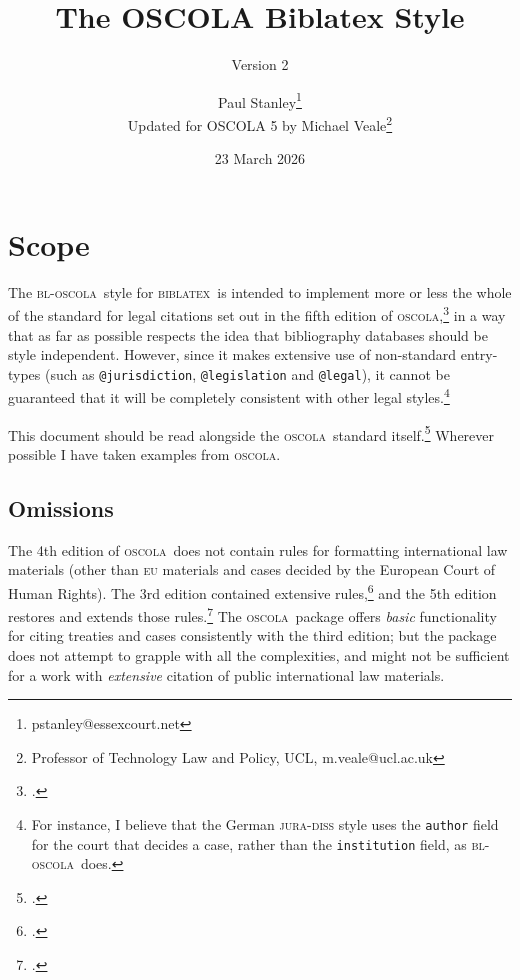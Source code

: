 \documentclass[a4paper,
               11pt,
	       DIV=1,			   
	       footinclude=false]
	      {scrartcl}
\def\releasedate{23 March 2026}
\def\versionnumber{2}
\newcommand{\oscola}{\textsc{bl-oscola}}
\newcommand{\biblatex}{\textsc{biblatex}}
\newcommand{\oscolashort}{\textsc{oscola}\nocite{oscola}}
\begin{document}
\title{The OSCOLA Biblatex Style}
\subtitle{Version \versionnumber}

\author{Paul Stanley\thanks{pstanley@essexcourt.net}\\ Updated for OSCOLA 5 by Michael Veale\thanks{Professor of Technology Law and Policy, UCL, m.veale@ucl.ac.uk}}

\date{\releasedate}

\maketitle

\tableofcontents

\clearpage

\section{Scope}

The \oscola\ style for \biblatex\
is intended to implement more or less the whole of the standard for
legal citations set out in the fifth edition of
\oscolashort,\footcite{oscola} in a way that as far as possible
respects the idea that bibliography databases should be style
independent. However, since it
makes extensive use of non-standard entry-types (such as
\texttt{@jurisdiction}, \texttt{@legislation} and \texttt{@legal}), it
cannot be guaranteed that it will be completely consistent with other
legal styles.\footnote{For instance, I believe that the German
  \textsc{jura-diss} style uses the \texttt{author} field for the
  court that decides a case, rather than the \texttt{institution}
  field, as \oscola\ does.}

This document should be read alongside the \oscolashort\ standard
itself.\footcite{oscola} Wherever possible I have taken examples from
\oscolashort.

\subsection{Omissions\label{scope}}

 The 4th edition of \oscolashort\ does not contain rules for formatting
international law materials (other than \textsc{eu} materials and
cases decided by the European Court of Human Rights). The 3rd edition
contained extensive rules,\footcite[25--37]{oscola3} and the 5th edition restores and extends those rules.\footcite[45--62]{oscola5} The \oscolashort\
package offers \emph{basic} functionality for citing treaties and cases
consistently with the third edition; but the package does not attempt
to grapple with all the complexities, and might not be sufficient for
a work with \emph{extensive} citation of public international law
materials.
\end{document}
